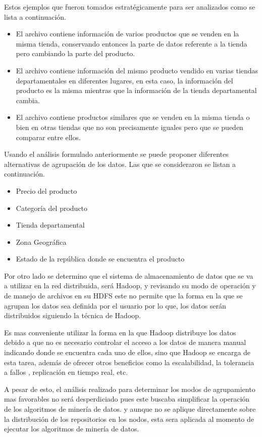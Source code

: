 Estos ejemplos que fueron tomados estratégicamente para ser analizados como se lista a continuación.
\begin{itemize}
	\item El archivo contiene información de varios productos que se venden en la misma tienda, conservando entonces la parte de datos referente a la tienda pero cambiando la parte del producto.
	\item El archivo contiene información del mismo producto vendido en varias tiendas departamentales en diferentes lugares, en esta caso, la información del producto es la misma mientras que la información de la tienda departamental cambia.
	\item El archivo contiene productos similares que se venden en la misma tienda o bien en otras tiendas que no son precisamente iguales pero que se pueden comparar entre ellos.
\end{itemize}
Usando el análisis formulado anteriormente se puede proponer diferentes alternativas de agrupación de los datos. Las que se consideraron se listan a continuación.
\begin{itemize}
	\item Precio del producto
	\item Categoría del producto
	\item Tienda departamental
	\item Zona Geográfica
	\item Estado de la república donde se encuentra el producto 
\end{itemize}

Por otro lado se determino que el sistema de almacenamiento de datos que se va a utilizar en la red distribuida, será Hadoop, y revisando su modo de operación y de manejo de archivos en su HDFS este no permite que la forma en la que se agrupan los datos sea definida por el usuario por lo que, los datos serán distribuidos siguiendo la técnica de Hadoop.

Es mas conveniente utilizar la forma en la que Hadoop distribuye los datos debido a que no es necesario controlar el acceso a los datos de manera manual indicando donde se encuentra cada uno de ellos, sino que Hadoop se encarga de esta tarea, además de ofrecer otros beneficios como la escalabilidad, la tolerancia a fallos , replicación en tiempo real, etc. 

A pesar de esto, el análisis realizado para determinar los modos de agrupamiento mas favorables no será desperdiciado pues este buscaba simplificar la operación de los algoritmos de minería de datos. y aunque no se aplique directamente sobre la distribución de los repositorios en los nodos, esta sera aplicada al momento de ejecutar los algoritmos de minería de datos. 

